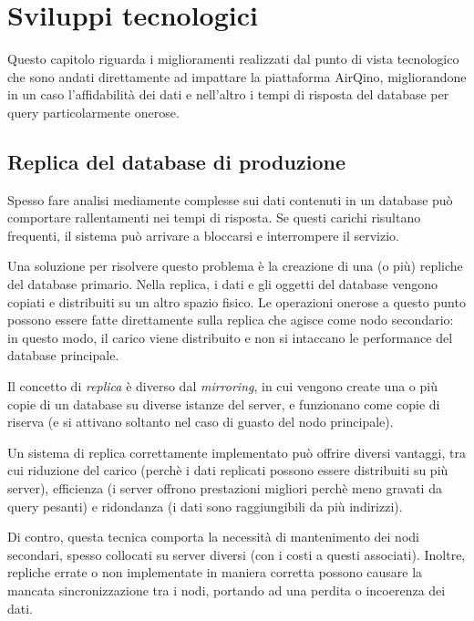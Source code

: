 \chapter{Sviluppi tecnologici}\label{ch:sviluppi}
Questo capitolo riguarda i miglioramenti realizzati dal punto di vista tecnologico che sono andati direttamente ad impattare la piattaforma AirQino, migliorandone in un caso l'affidabilità dei dati e nell'altro i tempi di risposta del database per query particolarmente onerose.

\section{Replica del database di produzione}\label{sec:replica}

Spesso fare analisi mediamente complesse sui dati contenuti in un database può comportare rallentamenti nei tempi di risposta. Se questi carichi risultano frequenti, il sistema può arrivare a bloccarsi e interrompere il servizio.

Una soluzione per risolvere questo problema è la creazione di una (o più) repliche del database primario. Nella replica, i dati e gli oggetti del database vengono copiati e distribuiti su un altro spazio fisico. Le operazioni onerose a questo punto possono essere fatte direttamente sulla replica che agisce come nodo secondario: in questo modo, il carico viene distribuito e non si intaccano le performance del database principale.

Il concetto di \textit{replica} è diverso dal \textit{mirroring}, in cui vengono create una o più copie di un database su diverse istanze del server, e funzionano come copie di riserva (e si attivano soltanto nel caso di guasto del nodo principale).

Un sistema di replica correttamente implementato può offrire diversi vantaggi, tra cui riduzione del carico (perchè i dati replicati possono essere distribuiti su più server), efficienza (i server offrono prestazioni migliori perchè meno gravati da query pesanti) e ridondanza (i dati sono raggiungibili da più indirizzi).

Di contro, questa tecnica comporta la necessità di mantenimento dei nodi secondari, spesso collocati su server diversi (con i costi a questi associati). Inoltre, repliche errate o non implementate in maniera corretta possono causare la mancata sincronizzazione tra i nodi, portando ad una perdita o incoerenza dei dati.

